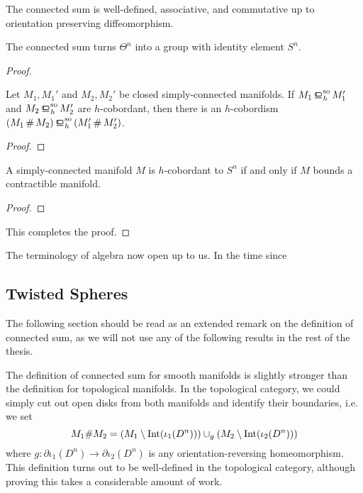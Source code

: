 \begin{corollary}
		The connected sum is well-defined, associative, and commutative up to orientation preserving diffeomorphism.
\end{corollary}

\begin{theorem}
	The connected sum turns $\Theta^n$ into a group with identity element $S^n$.
\end{theorem}
\begin{proof}

	\begin{changemargins}
	\begin{lemma}
		Let $M_1, M_1'$ and $M_2, M_2'$ be closed simply-connected manifolds. If $M_1\sohbord M_1'$ and $M_2\sohbord M_2'$ are $h$-cobordant, then there is an $h$-cobordism $(M_1\+ M_2) \sohbord (M_1'\+M_2')$.
	\end{lemma}
	\begin{proof}
	\end{proof}
	\end{changemargins}

	\begin{changemargins}
	\begin{lemma}
		A simply-connected manifold $M$ is $h$-cobordant to $S^n$ if and only if $M$ bounds a contractible manifold.
	\end{lemma}
	\begin{proof}
	\todo{write the proof}
	\end{proof}
	\end{changemargins}

	\noindent This completes the proof.
\end{proof}

The terminology of algebra now open up to us. In the time since 

\subsection{Twisted Spheres}
	The following section should be read as an extended remark on the definition of connected sum, as we will not use any of the following results in the rest of the thesis.

	The definition of connected sum for smooth manifolds is slightly stronger than the definition for topological manifolds. In the topological category, we could simply cut out open disks from both manifolds and identify their boundaries, i.e. we set
	\begin{equation}\label{eq:connected-sum-in-topological-category}
		M_1\# M_2 = (M_1\setminus {\operatorname{Int}}(\iota_1(D^n)))\cup_g (M_2\setminus {\operatorname{Int}}(\iota_2(D^n)))
	\end{equation}
	where $g : \partial \iota_1(D^n) \to \partial \iota_2(D^n)$ is any orientation-reversing homeomorphism. This definition turns out to be well-defined in the topological category, although proving this takes a considerable amount of work. 

